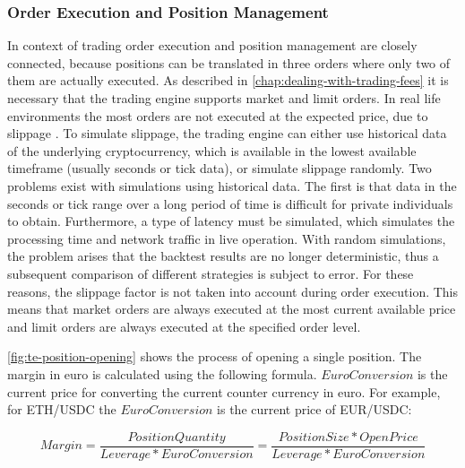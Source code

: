 \subsubsection{Order Execution and Position Management}

In context of trading order execution and position management are closely connected, because positions can be translated in three orders where only two of them are actually executed. As described in \autoref{chap:dealing-with-trading-fees} it is necessary that the trading engine supports market and limit orders. In real life environments the most orders are not executed at the expected price, due to slippage \cite{ig-slippage}. To simulate slippage, the trading engine can either use historical data of the underlying cryptocurrency, which is available in the lowest available timeframe (usually seconds or tick data), or simulate slippage randomly. Two problems exist with simulations using historical data. The first is that data in the seconds or tick range over a long period of time is difficult for private individuals to obtain. Furthermore, a type of latency must be simulated, which simulates the processing time and network traffic in live operation. With random simulations, the problem arises that the backtest results are no longer deterministic, thus a subsequent comparison of different strategies is subject to error. For these reasons, the slippage factor is not taken into account during order execution. This means that market orders are always executed at the most current available price and limit orders are always executed at the specified order level.


\autoref{fig:te-position-opening} shows the process of opening a single position. The margin in euro is calculated using the following formula. $EuroConversion$ is the current price for converting the current counter currency in euro. For example, for ETH/USDC the $EuroConversion$ is the current price of EUR/USDC:

\begin{equation}
    Margin = \frac{PositionQuantity}{Leverage * EuroConversion} = \frac{PositionSize * OpenPrice}{Leverage * EuroConversion}
\end{equation}

